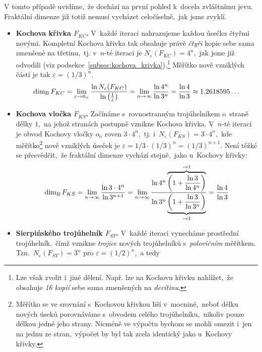 V tomto případě uvidíme,~že dochází na první pohled k~docela zvláštnímu jevu. Fraktální dimenze již totiž nemusí vycházet celočíselně,~jak jsme zvyklí.
\begin{itemize}
    \item \textbf{Kochova křivka $F_{KC}$.} V~každé iteraci nahrazujeme každou úsečku čtyřmi novými. Kompletní Kochova křivka tak obsahuje právě \emph{čtyři} kopie sebe sama zmenšené na třetinu,~tj. v~$n$-té iteraci je $N_\varepsilon(F_{KC})=4^n$,~jak jsme již odvodili (viz podsekce~\ref{subsec:kochova_krivka}).\footnote{Lze však zvolit i~jiné dělení. Např. lze na Kochovu křivku nahlížet,~že obsahuje \emph{16 kopií} sebe sama zmenšených na \emph{devítinu}.} Měřítko nově vzniklých částí je tak $\varepsilon=(1/3)^n$.
    \begin{equation}\label{eq:kochova-krivka-dimenze}
        \operatorname{dim_B}{F_{KC}}=\lim_{\varepsilon\to 0_+}{\dfrac{\ln{N_\varepsilon(F_{KC})}}{\ln{\left(\frac{1}{\varepsilon}\right)}}}=\lim_{n\to\infty}{\dfrac{\ln{4^n}}{\ln{3^n}}}=\dfrac{\ln{4}}{\ln{3}}\approx 1{,}2618595\dots
    \end{equation}
    \item \textbf{Kochova vločka $F_{KS}$.} Začínáme s~rovnostranným trojúhelníkem o~straně délky $1$,~na jehož stranách postupně vznikne Kochova křivka. V~$n$-té iteraci je obvod Kochovy vločky $o_n$ roven $3\cdot 4^n$,~tj. i~$N_\varepsilon(F_{KS})=3\cdot 4^n$,~kde měřítko\footnote{Měřítko se ve srovnání s~Kochovou křivkou liší v~mocnině,~neboť délku nových úseků porovnáváme s~obvodem celého trojúhelníku,~nikoliv pouze délkou jedné jeho strany. Nicméně ve výpočtu bychom se mohli omezit i~jen na jednu ze stran,~výpočet by byl tak zcela identický jako u~Kochovy křivky.} nově vzniklých úseček je $\varepsilon=1/3\cdot(1/3)^n=(1/3)^{n+1}$. Není těžké se přesvědčit,~že fraktální dimenze vychází stejně,~jako u~Kochovy křivky:
    \begin{equation}\label{eq:kochova-vlocka-dimenze}
        \operatorname{dim_B}{F_{KS}}=\lim_{n\to\infty}{\dfrac{\ln{3\cdot 4^n}}{\ln{3^{n+1}}}}=\lim_{n\to\infty}{\dfrac{\ln{4^n}\overbrace{\left(1+\frac{\ln{3}}{\ln{4^n}}\right)}^{\to 1}}{\ln{3^n}\underbrace{\left(1+\frac{\ln{3}}{\ln{3^n}}\right)}_{\to 1}}}=\dfrac{\ln{4}}{\ln{3}}
    \end{equation}
    \item \textbf{Sierpińského trojúhelník $F_{ST}$.} V~každé iteraci vynecháme prostřední trojúhelník,~čímž vznikne \emph{trojice} nových trojúhelníků s~\emph{polovičním} měřítkem. Tzn.~$N_\varepsilon(F_{ST})=3^n$ pro $\varepsilon=(1/2)^n$,~a tedy

\end{itemize}
